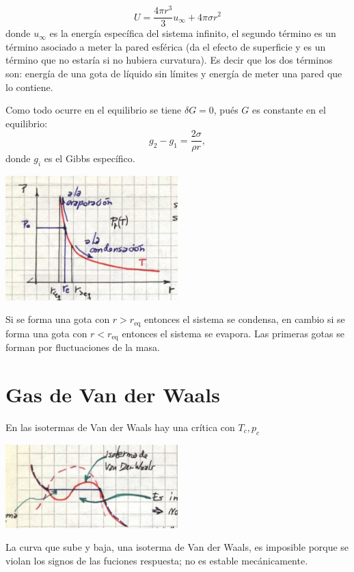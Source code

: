 \documentclass[10pt,oneside]{CBFT_book}
\begin{document}
\[
	U = \frac{4 \pi r^3 }{3} u_\infty + 4 \pi \sigma r^2
\]
donde $u_\infty$ es la energía específica del sistema infinito, el segundo término es un término
asociado a meter la pared esférica (da el efecto de superficie y es un término que no estaría
si no hubiera curvatura). Es decir que los dos términos son: energía de una gota de líquido
sin límites y energía de meter una pared que lo contiene.

Como todo ocurre en el equilibrio se tiene $\delta G=0$, pués $G$ es constante en el equilibrio:
\[
	g_2 - g_1 = \frac{2 \sigma}{\rho r},
\]
donde $g_i$ es el Gibbs específico.

\includegraphics[width=0.50\textwidth]{images/1606329061.jpg}

Si se forma una gota con $r > r_{\text{eq}}$ entonces el sistema se condensa, en cambio si
se forma una gota con $r < r_{\text{eq}}$ entonces el sistema se evapora.
Las primeras gotas se forman por fluctuaciones de la masa.

\section{Gas de Van der Waals}

En las isotermas de Van der Waals hay una crítica con $T_c, p_c$

\includegraphics[width=0.50\textwidth]{images/1606329065.jpg}

La curva que sube y baja, una isoterma de Van der Waals, es imposible porque se violan los signos 
de las fuciones respuesta; no es estable mecánicamente.
\end{document}
